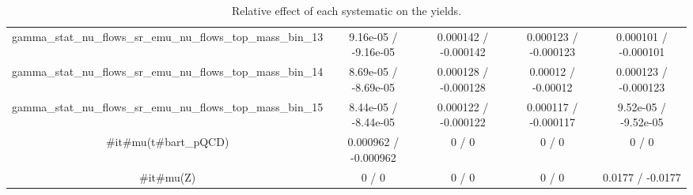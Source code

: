\documentclass[10pt]{article}
\begin{document}
\begin{table}[htbp]
\begin{center}
\begin{tabular}{|c|c|c|c|c|}
  gamma_stat_nu_flows_sr_emu_nu_flows_top_mass_bin_13 & 9.16e-05 / -9.16e-05 & 0.000142 / -0.000142 & 0.000123 / -0.000123 & 0.000101 / -0.000101 \\ 
  gamma_stat_nu_flows_sr_emu_nu_flows_top_mass_bin_14 & 8.69e-05 / -8.69e-05 & 0.000128 / -0.000128 & 0.00012 / -0.00012 & 0.000123 / -0.000123 \\ 
  gamma_stat_nu_flows_sr_emu_nu_flows_top_mass_bin_15 & 8.44e-05 / -8.44e-05 & 0.000122 / -0.000122 & 0.000117 / -0.000117 & 9.52e-05 / -9.52e-05 \\ 
  #it{#mu}(t#bar{t}_{pQCD}) & 0.000962 / -0.000962 & 0 / 0 & 0 / 0 & 0 / 0 \\ 
  #it{#mu}(Z) & 0 / 0 & 0 / 0 & 0 / 0 & 0.0177 / -0.0177 \\ 
\hline 
\end{tabular} 
\caption{Relative effect of each systematic on the yields.} 
\end{center} 
\end{table} 
\end{document}

